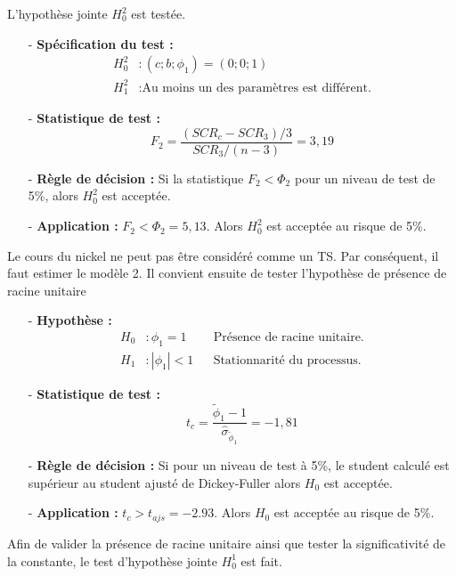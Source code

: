 %
L'hypothèse jointe $H_{0}^{2}$ est testée.
%
\begin{itemize}
\item[-]\textbf{Spécification du test :} 
\begin{equation*}
    \begin{split}
        H_{0}^{2} &: (c; b; \phi_{1}) = (0;0;1)\\
        H_{1}^{2} &: \text{Au moins un des paramètres est différent.}
    \end{split}
\end{equation*}
\item[-]\textbf{Statistique de test :}
\begin{equation*}
    F_{2} = \frac{(SCR_{c} - SCR_{3})/3}{SCR_{3}/(n-3)} = 3,19
\end{equation*}
\item[-]\textbf{Règle de décision :}  Si la statistique $F_{2} < \Phi_{2}$ pour un niveau de test de 5\%, alors $H_{0}^{2}$ est acceptée.
\item[-]\textbf{Application :} $F_{2} < \Phi_{2} = 5,13 $. Alors $H_{0}^{2}$ est acceptée au risque de 5\%. 
\end{itemize}
%
Le cours du nickel ne peut pas être considéré comme un TS. Par conséquent, il faut estimer le modèle 2. Il convient ensuite de tester l'hypothèse de présence de racine
unitaire
%
\begin{itemize}
\item[-]\textbf{ Hypothèse :} 
\begin{align*}
        H_{0} &: \phi_{1} = 1  & &\text{Présence de racine unitaire.}\\
        H_{1} &:|\phi_{1}| < 1   &  &\text{Stationnarité du processus.}
\end{align*}
\item[-]\textbf{Statistique de test :} 
\begin{equation*}
    t_{c} = \frac{\tilde{\phi}_{1}- 1}{\hat{\sigma}_{\tilde{\phi}_{1}}} = -1,81
\end{equation*}
\item[-]\textbf{Règle de décision :} Si pour un niveau de test à 5\%, le student calculé est supérieur au student ajusté de Dickey-Fuller alors $H_{0}$ est acceptée.
\item[-]\textbf{Application :} $t_{c} > t_{ajs} = -2.93$. Alors $H_{0}$ est acceptée au risque de 5\%.
\end{itemize}
%
Afin de valider la présence de racine unitaire ainsi que tester la significativité de la constante, le test d'hypothèse jointe $H_{0}^{1}$ est fait.
